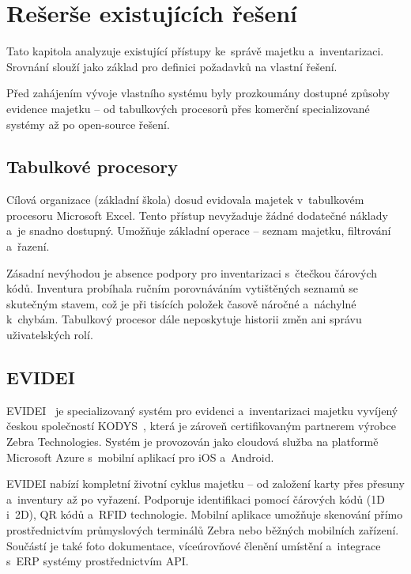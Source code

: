 \chapter{Rešerše existujících řešení}\label{chap:research}

\begin{chapterabstract}
	Tato kapitola analyzuje existující přístupy ke~správě majetku a~inventarizaci. Srovnání slouží jako základ pro definici požadavků na vlastní řešení.
\end{chapterabstract}

Před zahájením vývoje vlastního systému byly prozkoumány dostupné způsoby evidence majetku -- od tabulkových procesorů přes komerční specializované systémy až po open-source řešení.

\section{Tabulkové procesory}

Cílová organizace (základní škola) dosud evidovala majetek v~tabulkovém procesoru Microsoft Excel. Tento přístup nevyžaduje žádné dodatečné náklady a~je snadno dostupný. Umožňuje základní operace -- seznam majetku, filtrování a~řazení.

Zásadní nevýhodou je absence podpory pro inventarizaci s~čtečkou čárových kódů. Inventura probíhala ručním porovnáváním vytištěných seznamů se skutečným stavem, což je při tisících položek časově náročné a~náchylné k~chybám. Tabulkový procesor dále neposkytuje historii změn ani správu uživatelských rolí.

\section{EVIDEI}

EVIDEI~\cite{evidei} je specializovaný systém pro evidenci a~inventarizaci majetku vyvíjený českou společností KODYS~\cite{kodys}, která je zároveň certifikovaným partnerem výrobce Zebra Technologies. Systém je provozován jako cloudová služba na platformě Microsoft Azure s~mobilní aplikací pro iOS a~Android.

EVIDEI nabízí kompletní životní cyklus majetku -- od založení karty přes přesuny a~inventury až po vyřazení. Podporuje identifikaci pomocí čárových kódů (1D i~2D), QR kódů a~RFID technologie. Mobilní aplikace umožňuje skenování přímo prostřednictvím průmyslových terminálů Zebra nebo běžných mobilních zařízení. Součástí je také foto dokumentace, víceúrovňové členění umístění a~integrace s~ERP systémy prostřednictvím API.

